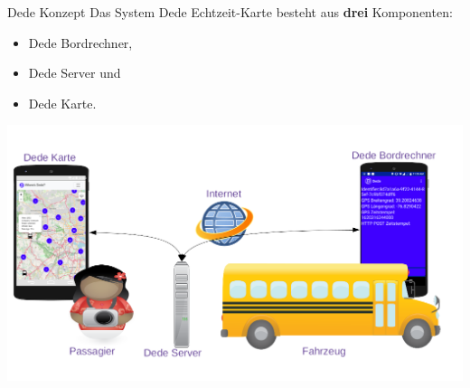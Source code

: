 
\begin{frame}{Dede Konzept}
  Das System Dede Echtzeit-Karte besteht aus \textbf{drei} Komponenten:\\
  \begin{itemize}
  \item Dede Bordrechner,
  \item Dede Server und
  \item Dede Karte.
  \end{itemize}
  \includegraphics[width=0.8\paperwidth]{dede/dede-concept}
\end{frame}
